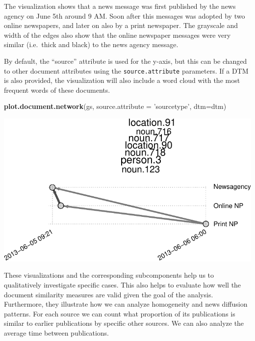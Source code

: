\documentclass[]{article}
\newenvironment{Shaded}{\begin{snugshade}}{\end{snugshade}}
\newcommand{\KeywordTok}[1]{\textcolor[rgb]{0.13,0.29,0.53}{\textbf{{#1}}}}
\newcommand{\DataTypeTok}[1]{\textcolor[rgb]{0.13,0.29,0.53}{{#1}}}
\newcommand{\StringTok}[1]{\textcolor[rgb]{0.31,0.60,0.02}{{#1}}}
\newcommand{\NormalTok}[1]{{#1}}
\begin{document}
The visualization shows that a news message was first published by the
news agency on June 5th around 9 AM. Soon after this messages was
adopted by two online newspapers, and later on also by a print
newspaper. The grayscale and width of the edges also show that the
online newspaper messages were very similar (i.e.~thick and black) to
the news agency message.

By default, the ``source'' attribute is used for the y-axis, but this
can be changed to other document attributes using the
\texttt{source.attribute} parameters. If a DTM is also provided, the
visualization will also include a word cloud with the most frequent
words of these documents.

\begin{Shaded}
\begin{Highlighting}[]
\KeywordTok{plot.document.network}\NormalTok{(gs, }\DataTypeTok{source.attribute =} \StringTok{'sourcetype'}\NormalTok{, }\DataTypeTok{dtm=}\NormalTok{dtm)}
\end{Highlighting}
\end{Shaded}

\includegraphics{vignette_files/figure-latex/unnamed-chunk-16-1.pdf}

These visualizations and the corresponding subcomponents help us to
qualitatively investigate specific cases. This also helps to evaluate
how well the document similarity measures are valid given the goal of
the analysis. Furthermore, they illustrate how we can analyze
homogeneity and news diffusion patterns. For each source we can count
what proportion of its publications is similar to earlier publications
by specific other sources. We can also analyze the average time between
publications.
\end{document}
